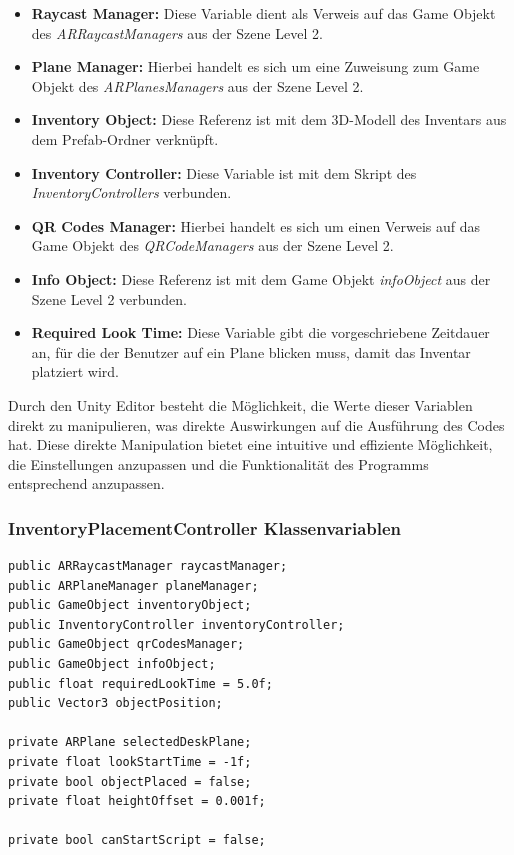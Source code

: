 \begin{itemize}
    \item \textbf{Raycast Manager:} Diese Variable dient als Verweis auf das Game Objekt des \textit{ARRaycastManagers}
    aus der Szene Level 2.
    \item \textbf{Plane Manager:} Hierbei handelt es sich um eine Zuweisung zum Game Objekt des \textit{ARPlanesManagers}
    aus der Szene Level 2.
    \item \textbf{Inventory Object:} Diese Referenz ist mit dem 3D-Modell des Inventars aus dem Prefab-Ordner verknüpft.
    \item \textbf{Inventory Controller:} Diese Variable ist mit dem Skript des \textit{InventoryControllers} verbunden.
    \item \textbf{QR Codes Manager:} Hierbei handelt es sich um einen Verweis auf das Game Objekt des \textit{QRCodeManagers}
    aus der Szene Level 2.
    \item \textbf{Info Object:} Diese Referenz ist mit dem Game Objekt \textit{infoObject} aus der Szene Level 2 verbunden.
    \item \textbf{Required Look Time:} Diese Variable gibt die vorgeschriebene Zeitdauer an, für die der Benutzer auf ein
    Plane blicken muss, damit das Inventar platziert wird.
\end{itemize}

Durch den Unity Editor besteht die Möglichkeit, die Werte dieser Variablen direkt zu manipulieren, was direkte Auswirkungen
auf die Ausführung des Codes hat. Diese direkte Manipulation bietet eine intuitive und effiziente Möglichkeit, die
Einstellungen anzupassen und die Funktionalität des Programms entsprechend anzupassen.

\subsubsection{InventoryPlacementController Klassenvariablen}
\begin{lstlisting}[style=csharp, caption={Klassenvariablen der InventoryPlacementController Klasse}, label=code:anchor_var]
public ARRaycastManager raycastManager;
public ARPlaneManager planeManager;
public GameObject inventoryObject;
public InventoryController inventoryController;
public GameObject qrCodesManager;
public GameObject infoObject;
public float requiredLookTime = 5.0f;
public Vector3 objectPosition;

private ARPlane selectedDeskPlane;
private float lookStartTime = -1f;
private bool objectPlaced = false;
private float heightOffset = 0.001f;

private bool canStartScript = false;
\end{lstlisting}

